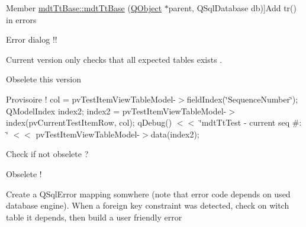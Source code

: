 \begin{DoxyRefList}
\hypertarget{todo__todo000064}{}%
Member \hyperlink{classmdt_tt_base_a6dbd221d1518e30c3692a7ba54b57c03}{mdt\-Tt\-Base\-:\-:mdt\-Tt\-Base} (\hyperlink{class_q_object}{Q\-Object} $\ast$parent, Q\-Sql\-Database db)]Add tr() in errors  
\item[\label{todo__todo000066}%
\hypertarget{todo__todo000066}{}%
Member \hyperlink{classmdt_tt_basic_tester_window_a55ed2ee382f4d560e5c5e055e69b7a6d}{mdt\-Tt\-Basic\-Tester\-Window\-:\-:init} ()]Error dialog !!  
\item[\label{todo__todo000068}%
\hypertarget{todo__todo000068}{}%
Member \hyperlink{classmdt_tt_database_schema_ace92b340a68ce07ad477502a68de4514}{mdt\-Tt\-Database\-Schema\-:\-:check\-Schema} ()]Current version only checks that all expected tables exists . 
\item[\label{todo__todo000080}%
\hypertarget{todo__todo000080}{}%
Member \hyperlink{classmdt_tt_logical_test_cable_a5abe6257d4ca126550b9ca9fb31a1ebc}{mdt\-Tt\-Logical\-Test\-Cable\-:\-:add\-Link} (const Q\-Variant \&test\-Connection\-Id, const Q\-Variant \&dut\-Connection\-Id, const Q\-Variant \&test\-Cable\-Id, const Q\-Variant \&identification, const Q\-Variant \&value)]Obselete this version  
\item[\label{todo__todo000081}%
\hypertarget{todo__todo000081}{}%
Member \hyperlink{classmdt_tt_test_a71e868fa2c182b33982276e52f9c4d23}{mdt\-Tt\-Test\-:\-:get\-Setup\-Data} (const Q\-Variant \&test\-Model\-Item\-Id, bool \&ok)]Provisoire ! col = pv\-Test\-Item\-View\-Table\-Model-\/$>$field\-Index(\char`\"{}\-Sequence\-Number\char`\"{}); Q\-Model\-Index index2; index2 = pv\-Test\-Item\-View\-Table\-Model-\/$>$index(pv\-Current\-Test\-Item\-Row, col); q\-Debug() $<$$<$ \char`\"{}mdt\-Tt\-Test -\/ current seq \#\-: \char`\"{} $<$$<$ pv\-Test\-Item\-View\-Table\-Model-\/$>$data(index2); 
\item[\label{todo__todo000084}%
\hypertarget{todo__todo000084}{}%
Class \hyperlink{classmdt_tt_test_data}{mdt\-Tt\-Test\-Data} ]Check if not obselete ?  
\item[\label{todo__todo000085}%
\hypertarget{todo__todo000085}{}%
Member \hyperlink{classmdt_tt_test_item_node_setup_data_a2c58ca8c543b503e7d96d3f13112078f}{mdt\-Tt\-Test\-Item\-Node\-Setup\-Data\-:\-:add\-Node\-Setup\-Data} (const \hyperlink{classmdt_tt_test_node_setup_data}{mdt\-Tt\-Test\-Node\-Setup\-Data} \&data)]Obselete !  
\item[\label{todo__todo000090}%
\hypertarget{todo__todo000090}{}%
Member \hyperlink{classmdt_tt_test_node_unit_a9da3578291033f5f9d77f186fe2fb325}{mdt\-Tt\-Test\-Node\-Unit\-:\-:get\-Test\-Links\-Depending\-On\-Connection} (const Q\-Variant \&test\-Node\-Unit\-Connection\-Id, bool \&ok)]Create a Q\-Sql\-Error mapping somwhere (note that error code depends on used database engine). When a foreign key constraint was detected, check on witch table it depends, then build a user friendly error  

\end{DoxyRefList}
